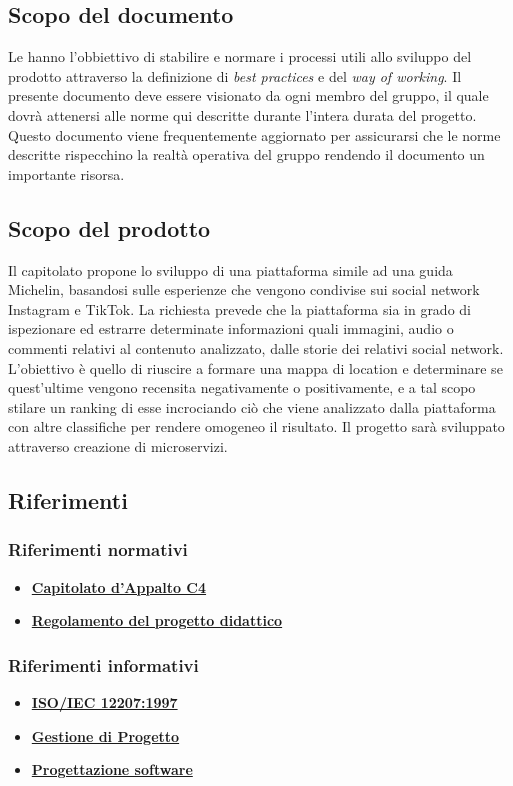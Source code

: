 \subsection{Scopo del documento}
Le \NdP{} hanno l'obbiettivo di stabilire e normare i processi utili allo sviluppo del prodotto attraverso la definizione di \emph{best practices} e del \emph{way of working}.
Il presente documento deve essere visionato da ogni membro del gruppo, il quale dovrà attenersi alle norme qui descritte durante l'intera durata del progetto.
Questo documento viene frequentemente aggiornato per assicurarsi che le norme descritte rispecchino la realtà operativa del gruppo rendendo il documento un importante risorsa.
\subsection{Scopo del prodotto}
Il capitolato propone lo sviluppo di una piattaforma simile ad una guida Michelin, basandosi sulle esperienze che vengono condivise sui social network Instagram e TikTok.
La richiesta prevede che la piattaforma sia in grado di ispezionare ed estrarre determinate informazioni quali immagini, audio o commenti relativi al contenuto analizzato, dalle storie dei relativi social network.
L'obiettivo è quello di riuscire a formare una mappa di location e determinare se quest'ultime vengono recensita negativamente o positivamente, e a tal scopo stilare un ranking di esse incrociando ciò che viene analizzato dalla piattaforma con altre classifiche per rendere omogeneo il risultato.
Il progetto sarà sviluppato attraverso creazione di microservizi.
\subsection{Riferimenti} %
\subsubsection{Riferimenti normativi}
\begin{itemize}
	\item
	\href{https://www.math.unipd.it/~tullio/IS-1/2021/Progetto/C4p.pdf}{\textbf{Capitolato d'Appalto C4}}
	\item
	\href{https://www.math.unipd.it/~tullio/IS-1/2021/Dispense/PD2.pdf}{\textbf{Regolamento del progetto didattico}}
\end{itemize}
\subsubsection{Riferimenti informativi}
\begin{itemize}
	\item \href{https://www.math.unipd.it/~tullio/IS-1/2009/Approfondimenti/ISO_12207-1995.pdf}{\textbf{ISO/IEC 12207:1997}}
	\item
	\href {https://www.math.unipd.it/~tullio/IS-1/2021/Dispense/T06.pdf}{\textbf{Gestione di Progetto}}
	\item
	\href{https://www.math.unipd.it/~tullio/IS-1/2021/Dispense/T09.pdf}{\textbf{Progettazione software}}
\end{itemize}
